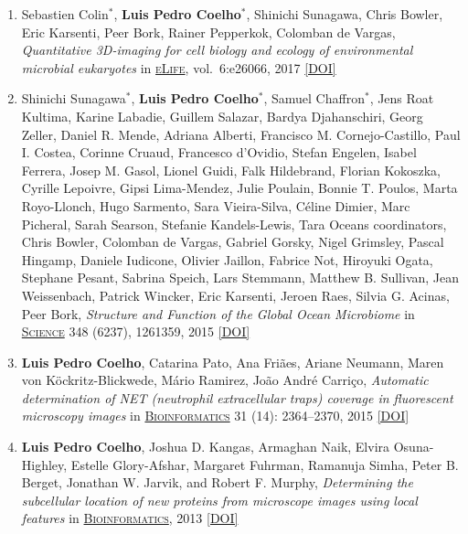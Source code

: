 \documentclass{article}
\newcommand\showdoi[1]{%
    \href{http://dx.doi.org/#1}{[DOI]}%
}
\newcommand\pubname[1]{\textsc{\uline{#1}}}
\newcommand\contribution[1]{\relax}
\newcommand\costar{${}^{*}$}
\begin{document}
\begin{enumerate}[resume]
\item Sebastien Colin\costar, \textbf{Luis Pedro Coelho}\costar, Shinichi
Sunagawa, Chris Bowler, Eric Karsenti, Peer Bork, Rainer Pepperkok, Colomban de
Vargas, \emph{Quantitative 3D-imaging for cell biology and ecology of
environmental microbial eukaryotes} in \pubname{eLife}, vol.\ 6:e26066, 2017
\showdoi{10.7554/eLife.26066.001}
\contribution{I designed and implemented the computational analysis necessary
for the method presented in the paper and participated in the writing of the
manuscript.}

\item Shinichi Sunagawa\costar, \textbf{Luis Pedro Coelho}\costar, Samuel
Chaffron\costar, Jens Roat Kultima, Karine Labadie, Guillem Salazar, Bardya
Djahanschiri, Georg Zeller, Daniel R. Mende, Adriana Alberti, Francisco M.
Cornejo-Castillo, Paul I. Costea, Corinne Cruaud, Francesco d'Ovidio, Stefan
Engelen, Isabel Ferrera, Josep M. Gasol, Lionel Guidi, Falk Hildebrand, Florian
Kokoszka, Cyrille Lepoivre, Gipsi Lima-Mendez, Julie Poulain, Bonnie T. Poulos,
Marta Royo-Llonch, Hugo Sarmento, Sara Vieira-Silva, Céline Dimier, Marc
Picheral, Sarah Searson, Stefanie Kandels-Lewis, Tara Oceans coordinators,
Chris Bowler, Colomban de Vargas, Gabriel Gorsky, Nigel Grimsley, Pascal
Hingamp, Daniele Iudicone, Olivier Jaillon, Fabrice Not, Hiroyuki Ogata,
Stephane Pesant, Sabrina Speich, Lars Stemmann, Matthew B. Sullivan, Jean
Weissenbach, Patrick Wincker, Eric Karsenti, Jeroen Raes, Silvia G. Acinas,
Peer Bork, \emph{Structure and Function of the Global Ocean Microbiome} in
\pubname{Science} 348 (6237), 1261359, 2015 \showdoi{10.1126/science.1261359}
\contribution{As co-first author, I performed analysis of the data, including
linking the metagenomics data to the environmental parameters, as well as the
comparison to the human gut (this required extending existing software tools
which were unable to scale to this dataset); and helped draft the manuscript.}

\item \textbf{Luis Pedro Coelho}, Catarina Pato, Ana Friães, Ariane Neumann,
Maren von Köckritz-Blickwede, Mário Ramirez, João André Carriço,
\emph{Automatic determination of NET (neutrophil extracellular traps) coverage
in fluorescent microscopy images} in \pubname{Bioinformatics} 31 (14):
2364--2370, 2015 \showdoi{10.1093/bioinformatics/btv156}
\contribution{I conceived and implemented the algorithm, and wrote the
manuscript.}

\item \textbf{Luis Pedro Coelho}, Joshua D. Kangas, Armaghan Naik, Elvira
Osuna-Highley, Estelle Glory-Afshar, Margaret Fuhrman, Ramanuja Simha, Peter B.
Berget, Jonathan W. Jarvik, and Robert F. Murphy, \emph{Determining the
subcellular location of new proteins from microscope images using local
features} in \pubname{Bioinformatics}, 2013 \showdoi{10.1093/bioinformatics/btt392}
\contribution{I designed and implemented the proposed algorithm, collected
microscopy data (in collaboration with other authors), and wrote the
manuscript.}


\end{enumerate}
\end{document}

